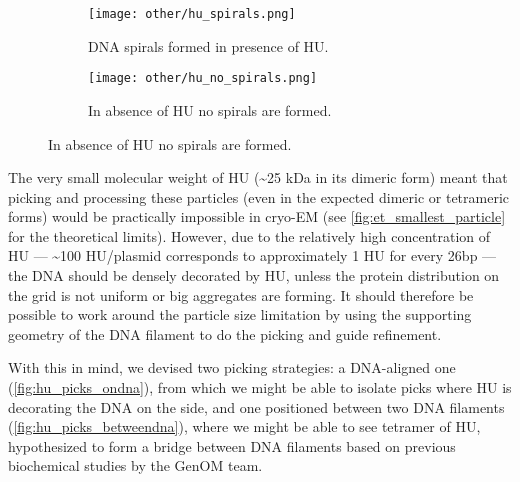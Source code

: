 \begin{figure}
    \centering
    \begin{subfigure}[B]{.49\textwidth}
        \centering
        \texttt{[image: other/hu\_spirals.png]}
        \caption{DNA spirals formed in presence of HU.}
        \label{fig:hu_spirals}
    \end{subfigure}%
    \hfill
    \begin{subfigure}[B]{.49\textwidth}
        \centering
        \texttt{[image: other/hu\_no\_spirals.png]}
        \caption{In absence of HU no spirals are formed.}
        \label{fig:hu_no_spirals}
    \end{subfigure}%
    \label{fig:hu_spirals_all}
\end{figure}

The very small molecular weight of HU (\sim25 kDa in its dimeric form) meant that picking and processing these particles (even in the expected dimeric or tetrameric forms) would be practically impossible in cryo-EM (see \autoref{fig:et_smallest_particle} for the theoretical limits).
However, due to the relatively high concentration of HU --- \sim100 HU/plasmid corresponds to approximately 1 HU for every 26bp --- the DNA should be densely decorated by HU, unless the protein distribution on the grid is not uniform or big aggregates are forming.
It should therefore be possible to work around the particle size limitation by using the supporting geometry of the DNA filament to do the picking and guide refinement.

With this in mind, we devised two picking strategies: a DNA-aligned one (\autoref{fig:hu_picks_ondna}), from which we might be able to isolate picks where HU is decorating the DNA on the side, and one positioned between two DNA filaments (\autoref{fig:hu_picks_betweendna}), where we might be able to see tetramer of HU, hypothesized to form a bridge between DNA filaments based on previous biochemical studies by the GenOM team.

